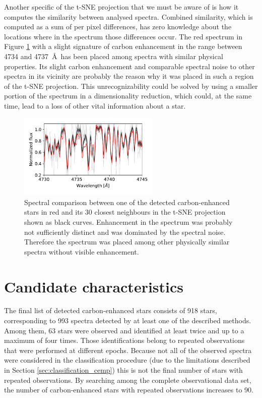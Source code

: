 Another specific of the t-SNE projection that we must be aware of is how it computes the similarity between analysed spectra. Combined similarity, which is computed as a sum of per pixel differences, has zero knowledge about the locations where in the spectrum those differences occur. The red spectrum in Figure \ref{fig:tsne_30close} with a slight signature of carbon enhancement in the range between 4734 and 4737~\AA\ has been placed among spectra with similar physical properties. Its slight carbon enhancement and comparable spectral noise to other spectra in its vicinity are probably the reason why it was placed in such a region of the t-SNE projection. This unrecognizability could be solved by using a smaller portion of the spectrum in a dimensionality reduction, which could, at the same time, lead to a loss of other vital information about a star.

\begin{figure}
	\centering
	\includegraphics[width=0.6\textwidth]{150206004301057_tsne_close30.pdf}
	\caption{Spectral comparison between one of the detected carbon-enhanced stars in red and its 30 closest neighbours in the t-SNE projection shown as black curves. Enhancement in the spectrum was probably not sufficiently distinct and was dominated by the spectral noise. Therefore the spectrum was placed among other physically similar spectra without visible enhancement.}
	\label{fig:tsne_30close}
\end{figure}

\section{Candidate characteristics}
\label{sec:analysis_cemp}
The final list of detected carbon-enhanced stars consists of 918 stars, corresponding to 993 spectra detected by at least one of the described methods. Among them, 63 stars were observed and identified at least twice and up to a maximum of four times. Those identifications belong to repeated observations that were performed at different epochs. Because not all of the observed spectra were considered in the classification procedure (due to the limitations described in Section \ref{sec:classification_cemp}) this is not the final number of stars with repeated observations. By searching among the complete observational data set, the number of carbon-enhanced stars with repeated observations increases to 90.

